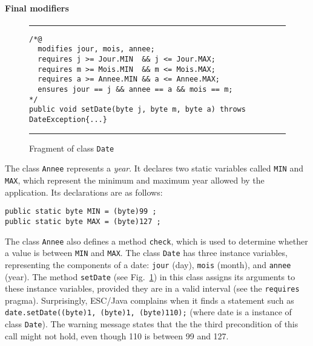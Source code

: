 \documentclass[a4paper]{llncs}
\begin{document}






\paragraph{Final modifiers}

\begin{figure}[t]
\rule{\linewidth}{0.3mm}
\begin{verbatim}
/*@
  modifies jour, mois, annee;
  requires j >= Jour.MIN  && j <= Jour.MAX;
  requires m >= Mois.MIN  && m <= Mois.MAX;
  requires a >= Annee.MIN && a <= Annee.MAX;
  ensures jour == j && annee == a && mois == m;
*/
public void setDate(byte j, byte m, byte a) throws DateException{...} 
\end{verbatim}
\caption{Fragment of class {\tt Date}}
\label{fig-cla-dat}
\rule{\linewidth}{0.3mm}
\end{figure}



The class \texttt{Annee} represents a \textit{year}. It 
declares two
static variables called \texttt{MIN} and \texttt{MAX}, which represent
the minimum and maximum year allowed by the application.
Its declarations are as follows:
\begin{verbatim}
public static byte MIN = (byte)99 ;
public static byte MAX = (byte)127 ;
\end{verbatim}

The class \texttt{Annee} also defines a method \texttt{check}, which is
used to determine whether a value is between \texttt{MIN} and
\texttt{MAX}. 
The class \texttt{Date} has three instance variables, representing the
components of a date: \texttt{jour} (day),
\texttt{mois} (month), and \texttt{annee} (year). The method
\texttt{setDate} (see Fig.~\ref{fig-cla-dat})
in this class assigns its arguments to these
instance variables, provided they are in a valid interval (see the
\texttt{requires} pragma). %
Surprisingly, ESC/Java complains when it
finds a statement such as
\mbox{\tt date.setDate((byte)1, (byte)1, (byte)110);} (where date is a
instance of class \texttt{Date}). The warning message states that the
the third precondition of this call might not hold, even though 110 is 
between 99 and 127.
\end{document}
